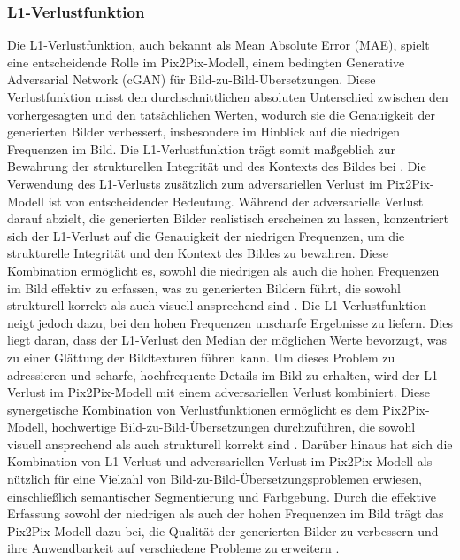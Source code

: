 \subsubsection{L1-Verlustfunktion}

Die L1-Verlustfunktion, auch bekannt als Mean Absolute Error (MAE), spielt eine entscheidende Rolle im Pix2Pix-Modell, einem bedingten Generative Adversarial Network (cGAN) für Bild-zu-Bild-Übersetzungen. Diese Verlustfunktion misst den durchschnittlichen absoluten Unterschied zwischen den vorhergesagten und den tatsächlichen Werten, wodurch sie die Genauigkeit der generierten Bilder verbessert, insbesondere im Hinblick auf die niedrigen Frequenzen im Bild. Die L1-Verlustfunktion trägt somit maßgeblich zur Bewahrung der strukturellen Integrität und des Kontexts des Bildes bei \cite{PhillipIsola.}. \newline
Die Verwendung des L1-Verlusts zusätzlich zum adversariellen Verlust im Pix2Pix-Modell ist von entscheidender Bedeutung. Während der adversarielle Verlust darauf abzielt, die generierten Bilder realistisch erscheinen zu lassen, konzentriert sich der L1-Verlust auf die Genauigkeit der niedrigen Frequenzen, um die strukturelle Integrität und den Kontext des Bildes zu bewahren. Diese Kombination ermöglicht es, sowohl die niedrigen als auch die hohen Frequenzen im Bild effektiv zu erfassen, was zu generierten Bildern führt, die sowohl strukturell korrekt als auch visuell ansprechend sind \cite{PhillipIsola.}. \newline
Die L1-Verlustfunktion neigt jedoch dazu, bei den hohen Frequenzen unscharfe Ergebnisse zu liefern. Dies liegt daran, dass der L1-Verlust den Median der möglichen Werte bevorzugt, was zu einer Glättung der Bildtexturen führen kann. Um dieses Problem zu adressieren und scharfe, hochfrequente Details im Bild zu erhalten, wird der L1-Verlust im Pix2Pix-Modell mit einem adversariellen Verlust kombiniert. Diese synergetische Kombination von Verlustfunktionen ermöglicht es dem Pix2Pix-Modell, hochwertige Bild-zu-Bild-Übersetzungen durchzuführen, die sowohl visuell ansprechend als auch strukturell korrekt sind \cite{PhillipIsola.}. \newline
Darüber hinaus hat sich die Kombination von L1-Verlust und adversariellen Verlust im Pix2Pix-Modell als nützlich für eine Vielzahl von Bild-zu-Bild-Übersetzungsproblemen erwiesen, einschließlich semantischer Segmentierung und Farbgebung. Durch die effektive Erfassung sowohl der niedrigen als auch der hohen Frequenzen im Bild trägt das Pix2Pix-Modell dazu bei, die Qualität der generierten Bilder zu verbessern und ihre Anwendbarkeit auf verschiedene Probleme zu erweitern \cite{PhillipIsola.}.

